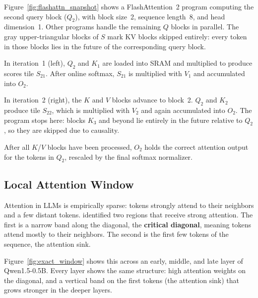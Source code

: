 Figure~\ref{fig:flashattn_snapshot} shows a FlashAttention~2 program computing the second query block ($Q_2$), with block size~2, sequence length~8, and head dimension~1. Other programs handle the remaining $Q$ blocks in parallel. The gray upper-triangular blocks of $S$ mark KV blocks skipped entirely: every token in those blocks lies in the future of the corresponding query block.

In iteration~1 (left), $Q_2$ and $K_1$ are loaded into SRAM and multiplied to produce scores tile $S_{21}$. After online softmax, $S_{21}$ is multiplied with $V_1$ and accumulated into $O_2$.

In iteration~2 (right), the $K$ and $V$ blocks advance to block~2. $Q_2$ and $K_2$ produce tile $S_{22}$, which is multiplied with $V_2$ and again accumulated into $O_2$. The program stops here: blocks $K_3$ and beyond lie entirely in the future relative to $Q_2$, so they are skipped due to causality.

After all $K$/$V$ blocks have been processed, $O_2$ holds the correct attention output for the tokens in $Q_2$, rescaled by the final softmax normalizer.



\subsection{Local Attention Window}
\label{sec:local_attention_window}

Attention in LLMs is empirically sparse: tokens strongly attend to their neighbors and a few distant tokens. \citet{xiao2023streamingllm} identified two regions that receive strong attention. The first is a narrow band along the diagonal, the \textbf{critical diagonal}, meaning tokens attend mostly to their neighbors. The second is the first few tokens of the sequence, the attention sink.

Figure~\ref{fig:exact_window} shows this across an early, middle, and late layer of Qwen1.5-0.5B. Every layer shows the same structure: high attention weights on the diagonal, and a vertical band on the first tokens (the attention sink) that grows stronger in the deeper layers.


